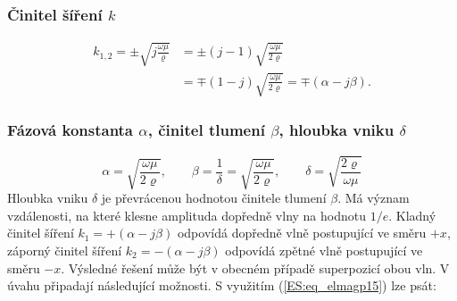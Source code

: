      \subsubsection{Činitel šíření \(k\)} 
       \begin{align}\label{ES:eq_elmagp47}
         k_{1,2} = \pm\sqrt{j\frac{\omega\mu}{\varrho}}            
                &= \pm(j-1)\sqrt{\frac{\omega\mu}{2\varrho}}      \nonumber \\
                &= \mp(1-j)\sqrt{\frac{\omega\mu}{2\varrho}} 
                 = \mp(\alpha - j\beta).
       \end{align}       

      \subsubsection{Fázová konstanta \(\alpha\), činitel tlumení \(\beta\), hloubka vniku  
                     \(\delta\)}
        \begin{equation}\label{ES:eq_elmagp48}
          \alpha = \sqrt{\frac{\omega\mu}{2\varrho}}, \qquad
           \beta = \frac{1}{\delta} = \sqrt{\frac{\omega\mu}{2\varrho}}, \qquad
          \delta = \sqrt{\frac{2\varrho}{\omega\mu}}  
        \end{equation} 
        Hloubka vniku \(\delta\) je převrácenou hodnotou činitele tlumení \(\beta\). Má význam 
        vzdálenosti, na které klesne amplituda dopředně vlny na hodnotu \(1/e\). Kladný činitel 
        šíření \(k_1 = +(\alpha - j\beta)\) odpovídá dopředně vlně postupující ve směru \(+x\), 
        záporný činitel šíření \(k_2 = -(\alpha - j\beta)\) odpovídá zpětné vlně postupující ve 
        směru \(-x\). Výsledné řešení může být v obecném případě superpozicí obou vln. V úvahu 
        připadají následující možnosti. S využitím (\ref{ES:eq_elmagp15}) lze psát:
